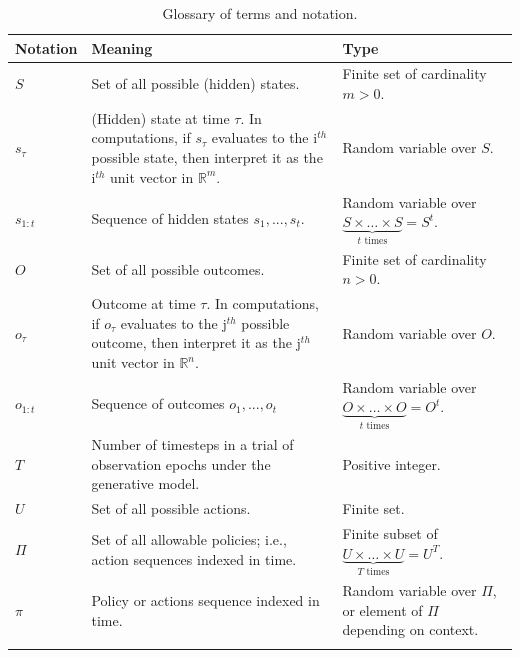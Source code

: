\documentclass[review,12pt,authoryear]{elsarticle}
\begin{document}
\begin{longtabu} to \textwidth {
    X[1,c]
    X[4,c]
    X[3,c]}
    \caption{Glossary of terms and notation.} \label{table:2} \\
            \toprule
            Notation & Meaning & Type \\
            \midrule
$S$ &	Set of all possible (hidden) states. & Finite set of cardinality $m>0$.\\\addlinespace[0.3cm]

$s_\tau$ & (Hidden) state at time $\tau$. In computations, if $s_\tau$ evaluates to the i$^{th}$ possible state, then interpret it as the i$^{th}$ unit vector in $\mathbb R^m$. &
Random variable over $S$. \\\addlinespace[0.3cm]

$s_{1:t}$ & Sequence of hidden states $s_1,...,s_t$. & Random variable over $\underbrace{S \times \ldots \times S}_{t \text{ times}} =S^t$. \\\addlinespace[0.3cm]

$O$ &	Set of all possible outcomes. &	Finite set of cardinality $n>0$.\\\addlinespace[0.3cm]

$o_\tau$& Outcome at time $\tau$. In computations, if $o_\tau$ evaluates to the j$^{th}$ possible outcome, then interpret it as the j$^{th}$ unit vector in $\mathbb R^n$. &
Random variable over $O$. \\\addlinespace[0.3cm]

$o_{1:t}$ & Sequence of outcomes $o_1,...,o_t$ & Random variable over $\underbrace{O \times \ldots \times O}_{t \text{ times}} =O^t$.\\\addlinespace[0.3cm]
 
$T$ & Number of timesteps in a trial of observation epochs under the generative model. & Positive integer. \\\addlinespace[0.3cm]

$U$ & Set of all possible actions. & Finite set.\\\addlinespace[0.3cm]
 
$\Pi$ & Set of all allowable policies; i.e., action sequences indexed in time. & Finite subset of $\underbrace{U \times \ldots \times U}_{T \text{ times}} =U^T$. \\\addlinespace[0.3cm]

$\pi$ & Policy or actions sequence indexed in time. & Random variable over $\Pi$, or element of $\Pi$ depending on context.
\\\addlinespace[0.3cm]


\end{longtabu}
\end{document}
